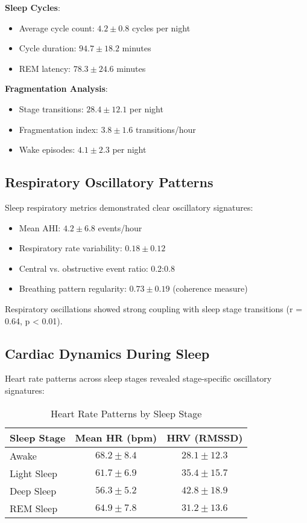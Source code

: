\documentclass[twocolumn]{article}
\begin{document}
\textbf{Sleep Cycles}:
\begin{itemize}
\item Average cycle count: $4.2 \pm 0.8$ cycles per night
\item Cycle duration: $94.7 \pm 18.2$ minutes
\item REM latency: $78.3 \pm 24.6$ minutes
\end{itemize}

\textbf{Fragmentation Analysis}:
\begin{itemize}
\item Stage transitions: $28.4 \pm 12.1$ per night
\item Fragmentation index: $3.8 \pm 1.6$ transitions/hour
\item Wake episodes: $4.1 \pm 2.3$ per night
\end{itemize}

\subsection{Respiratory Oscillatory Patterns}

Sleep respiratory metrics demonstrated clear oscillatory signatures:

\begin{itemize}
\item Mean AHI: $4.2 \pm 6.8$ events/hour
\item Respiratory rate variability: $0.18 \pm 0.12$
\item Central vs. obstructive event ratio: 0.2:0.8
\item Breathing pattern regularity: $0.73 \pm 0.19$ (coherence measure)
\end{itemize}

Respiratory oscillations showed strong coupling with sleep stage transitions (r = 0.64, p < 0.01).

\subsection{Cardiac Dynamics During Sleep}

Heart rate patterns across sleep stages revealed stage-specific oscillatory signatures:

\begin{table}[H]
\centering
\caption{Heart Rate Patterns by Sleep Stage}
\begin{tabular}{lcc}
\toprule
Sleep Stage & Mean HR (bpm) & HRV (RMSSD) \\
\midrule
Awake & $68.2 \pm 8.4$ & $28.1 \pm 12.3$ \\
Light Sleep & $61.7 \pm 6.9$ & $35.4 \pm 15.7$ \\
Deep Sleep & $56.3 \pm 5.2$ & $42.8 \pm 18.9$ \\
REM Sleep & $64.9 \pm 7.8$ & $31.2 \pm 13.6$ \\
\bottomrule
\end{tabular}
\end{table}
\end{document}
